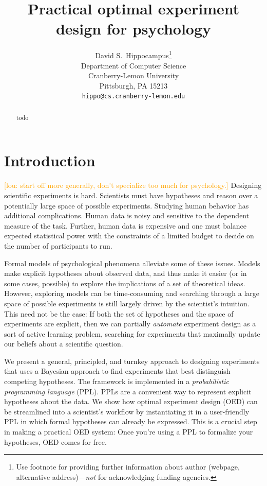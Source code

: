 \documentclass{article}
\title{Practical optimal experiment design for psychology}
\author{
  David S.~Hippocampus\thanks{Use footnote for providing further
    information about author (webpage, alternative
    address)---\emph{not} for acknowledging funding agencies.} \\
  Department of Computer Science\\
  Cranberry-Lemon University\\
  Pittsburgh, PA 15213 \\
  \texttt{hippo@cs.cranberry-lemon.edu} \\
}
\newcommand{\lou}[1]{\textcolor{orange}{[lou: #1]}}
\begin{document}

\maketitle

\begin{abstract}
todo
\end{abstract}

\section{Introduction}
\lou{start off more generally, don't specialize too much for psychology.}
Designing scientific experiments is hard.
Scientists must have hypotheses and reason over a potentially large space of possible experiments.
Studying human behavior has additional complications.
Human data is noisy and sensitive to the dependent measure of the task.
Further, human data is expensive and one must balance expected statistical power with the constraints of a limited budget to decide on the number of participants to run.

Formal models of psychological phenomena alleviate some of these issues.
Models make explicit hypotheses about observed data, and thus make it easier (or in some cases, possible) to explore the implications of a set of theoretical ideas.
However, exploring models can be time-consuming and searching through a large space of possible experiments is still largely driven by the scientist's intuition.
This need not be the case: If both the set of hypotheses and the space of experiments are explicit, then we can partially \emph{automate} experiment design as a sort of active learning problem, searching for experiments that maximally update our beliefs about a scientific question.

We present a general, principled, and turnkey approach to designing experiments that uses a Bayesian approach to find experiments that best distinguish competing hypotheses.
The framework is implemented in a \emph{probabilistic programming language} (PPL).
PPLs are a convenient way to represent explicit hypotheses about the data.
We show how optimal experiment design (OED) can be streamlined into a scientist's workflow by instantiating it in a user-friendly PPL in which formal hypotheses can already be expressed.
This is a crucial step in making a practical OED system: Once you're using a PPL to formalize your hypotheses, OED comes for free.
\end{document}

